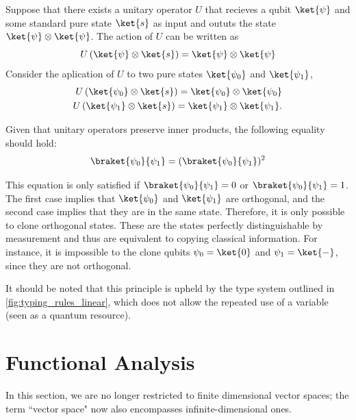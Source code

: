 Suppose that there exists a unitary operator $U$ that recieves a qubit $\ket{\psi}$ and some standard pure state $\ket{s}$ as input and oututs the state $\ket{\psi} \otimes \ket{\psi}$. The action of $U$ can be written as
\begin{equation*}
  U \left(\ket{\psi} \otimes \ket{s} \right) = \ket{\psi} \otimes \ket{\psi}
\end{equation*}
Consider the aplication of $U$ to two pure states $\ket{\psi_0}$ and $\ket{\psi_1}$,
\begin{align*}
  U \left(\ket{\psi_0} \otimes \ket{s} \right) = \ket{\psi_0} \otimes \ket{\psi_0} \\
  U \left(\ket{\psi_1} \otimes \ket{s} \right) = \ket{\psi_1} \otimes \ket{\psi_1}.
\end{align*}

Given that unitary operators preserve inner products, the following equality should hold:
\begin{equation*}
  \braket{\psi_0}{\psi_1} = ( \braket{\psi_0}{\psi_1})^{2}
\end{equation*}

This equation is only satisfied if $\braket{\psi_0}{\psi_1} = 0$ or $\braket{\psi_0}{\psi_1} = 1$. The first case implies that $\ket{\psi_0}$ and $\ket{\psi_1}$ are orthogonal, and the second case implies that they are in the same state. Therefore, it is only possible to clone orthogonal states. These are the states perfectly distinguishable by measurement and thus are equivalent to copying classical information. For instance, it is impossible to the clone qubits $\psi_0 = \ket{0}$ and $\psi_1 = \ket{-}$, since they are not orthogonal.

It should be noted that this principle is upheld by the type system outlined in \autoref{fig:typing_rules_linear}, which does not allow the repeated use of a variable (seen as a quantum resource).




\section{Functional Analysis}

In this section, we are no longer restricted to finite dimensional vector spaces; the term ``vector space" now also encompasses infinite-dimensional ones.



